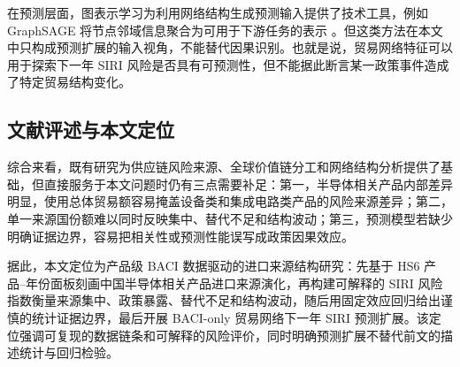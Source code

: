 在预测层面，图表示学习为利用网络结构生成预测输入提供了技术工具，例如 GraphSAGE 将节点邻域信息聚合为可用于下游任务的表示 \citep{hamilton2017inductive}。但这类方法在本文中只构成预测扩展的输入视角，不能替代因果识别。也就是说，贸易网络特征可以用于探索下一年 SIRI 风险是否具有可预测性，但不能据此断言某一政策事件造成了特定贸易结构变化。

\subsection{文献评述与本文定位}

综合来看，既有研究为供应链风险来源、全球价值链分工和网络结构分析提供了基础，但直接服务于本文问题时仍有三点需要补足：第一，半导体相关产品内部差异明显，使用总体贸易额容易掩盖设备类和集成电路类产品的风险来源差异；第二，单一来源国份额难以同时反映集中、替代不足和结构波动；第三，预测模型若缺少明确证据边界，容易把相关性或预测性能误写成政策因果效应。

据此，本文定位为产品级 BACI 数据驱动的进口来源结构研究：先基于 HS6 产品--年份面板刻画中国半导体相关产品进口来源演化，再构建可解释的 SIRI 风险指数衡量来源集中、政策暴露、替代不足和结构波动，随后用固定效应回归给出谨慎的统计证据边界，最后开展 BACI-only 贸易网络下一年 SIRI 预测扩展。该定位强调可复现的数据链条和可解释的风险评价，同时明确预测扩展不替代前文的描述统计与回归检验。
